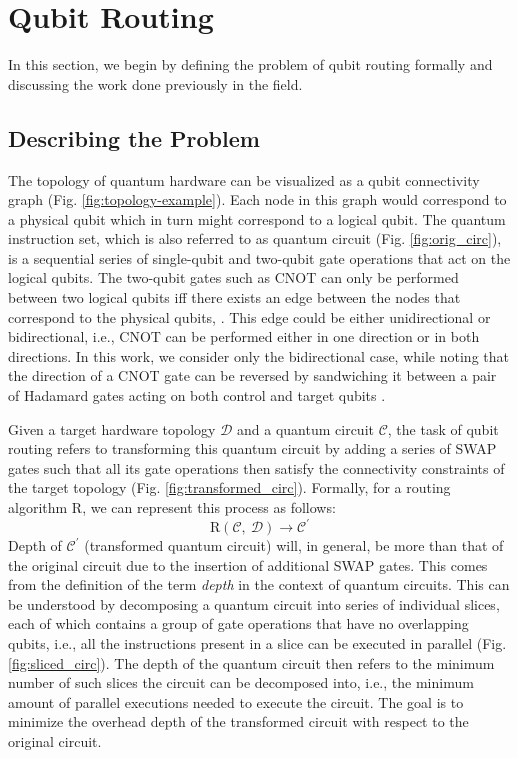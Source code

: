 \documentclass[%
 reprint,
amsmath,amssymb,showkeys,
pra,
]{revtex4-2}
\begin{document}
\section{\label{sec:qubit-routing}Qubit Routing}
In this section, we begin by defining the problem of qubit routing formally and discussing the work done previously in the field.

\subsection{\label{sec:intro-defn}Describing the Problem}
The topology of quantum hardware can be visualized as a qubit connectivity graph (Fig. \ref{fig:topology-example}). Each node in this graph would correspond to a physical qubit which in turn might correspond to a logical qubit. The quantum instruction set, which is also referred to as quantum circuit (Fig. \ref{fig:orig_circ}), is a sequential series of single-qubit and two-qubit gate operations that act on the logical qubits. The two-qubit gates such as CNOT can only be performed between two logical qubits iff there exists an edge between the nodes that correspond to the physical qubits, \citep{qroute_dqn1}. This edge could be either unidirectional or bidirectional, i.e., CNOT can be performed either in one direction or in both directions. In this work, we consider only the bidirectional case, while noting that the direction of a CNOT gate can be reversed by sandwiching it between a pair of Hadamard gates acting on both control and target qubits \cite{utk_equiv_circuits}. 

Given a target hardware topology $\mathcal{D}$ and a quantum circuit $\mathcal{C}$, the task of qubit routing refers to transforming this quantum circuit by adding a series of SWAP gates such that all its gate operations then satisfy the connectivity constraints of the target topology (Fig. \ref{fig:transformed_circ}). Formally, for a routing algorithm $\textrm{R}$, we can represent this process as follows:
\begin{equation*}
\textrm{R}(\mathcal{C},\ \mathcal{D}) \rightarrow \mathcal{C}^{\prime}
\end{equation*}
Depth of $\mathcal{C}^{\prime}$ (transformed quantum circuit) will, in general, be more than that of the original circuit due to the insertion of additional SWAP gates. This comes from the definition of the term \textit{depth} in the context of quantum circuits. This can be understood by decomposing a quantum circuit into series of individual slices, each of which contains a group of gate operations that have no overlapping qubits, i.e., all the instructions present in a slice can be executed in parallel (Fig. \ref{fig:sliced_circ}). The depth of the quantum circuit then refers to the minimum number of such slices the circuit can be decomposed into, i.e., the minimum amount of parallel executions needed to execute the circuit. The goal is to minimize the overhead depth of the transformed circuit with respect to the original circuit.
\end{document}
